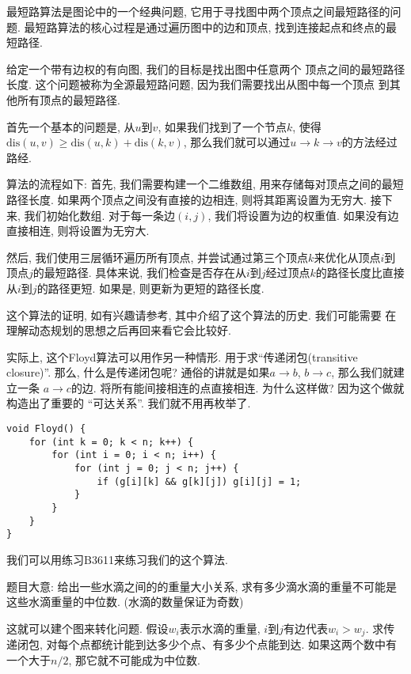  最短路算法是图论中的一个经典问题, 它用于寻找图中两个顶点之间最短路径的问题. 
最短路算法的核心过程是通过遍历图中的边和顶点, 找到连接起点和终点的最短路径. 

 给定一个带有边权的有向图, 我们的目标是找出图中任意两个
顶点之间的最短路径长度. 这个问题被称为全源最短路问题, 因为我们需要找出从图中每一个顶点
到其他所有顶点的最短路径. 

首先一个基本的问题是, 从$u$到$v$, 如果我们找到了一个节点$k$, 使得
$\text{dis}(u,v)\geq \text{dis}(u,k)+\text{dis}(k,v)$,
那么我们就可以通过$u\to k\to v$的方法经过路经. 

算法的流程如下: 首先, 我们需要构建一个二维数组, 用来存储每对顶点之间的最短路径长度. 
如果两个顶点之间没有直接的边相连, 则将其距离设置为无穷大. 接下来, 我们初始化数组. 
对于每一条边$(i, j)$, 我们将设置为边的权重值. 如果没有边直接相连, 
则将设置为无穷大. 

然后, 我们使用三层循环遍历所有顶点, 并尝试通过第三个顶点$k$来优化从顶点$i$到顶点$j$的最短路径. 
具体来说, 我们检查是否存在从$i$到$j$经过顶点$k$的路径长度比直接从$i$到$j$的路径更短. 
如果是, 则更新为更短的路径长度. 

这个算法的证明, 如有兴趣请参考\cite{algobook}, 其中介绍了这个算法的历史. 我们可能需要
在理解动态规划的思想之后再回来看它会比较好. 

实际上, 这个Floyd算法可以用作另一种情形. 用于求``传递闭包(transitive closure)''. 
那么, 什么是传递闭包呢? 通俗的讲就是如果$a\to b$,  $b\to c$, 那么我们就建立一条
$a\to c$的边. 将所有能间接相连的点直接相连. 为什么这样做? 因为这个做就构造出了重要的
``可达关系''. 我们就不用再枚举了. 

\begin{lstlisting}
void Floyd() {
    for (int k = 0; k < n; k++) {
        for (int i = 0; i < n; i++) {
            for (int j = 0; j < n; j++) {
                if (g[i][k] && g[k][j]) g[i][j] = 1;  
            }
        }
    }
}
\end{lstlisting}

 我们可以用练习B3611来练习我们的这个算法. 

题目大意: 给出一些水滴之间的的重量大小关系, 求有多少滴水滴的重量不可能是这些水滴重量的中位数.  (水滴的数量保证为奇数) 

这就可以建个图来转化问题. 假设$w_i$表示水滴的重量, $i$到$j$有边代表$w_i>w_j$. 
求传递闭包, 对每个点都统计能到达多少个点、有多少个点能到达. 
如果这两个数中有一个大于$n/2$, 那它就不可能成为中位数. 



